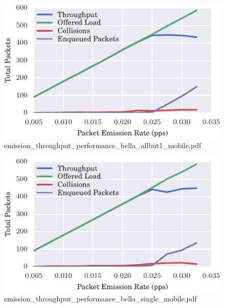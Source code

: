 \documentclass{article}
\begin{document}
\begin{figure}[h!]
\centering
\includegraphics[width=\linewidth]{emission_throughput_performance_bella_allbut1_mobile.pdf}
\caption{emission\_throughput\_performance\_bella\_allbut1\_mobile.pdf}
\end{figure}




\begin{figure}[h!]
\centering
\includegraphics[width=\linewidth]{emission_throughput_performance_bella_single_mobile.pdf}
\caption{emission\_throughput\_performance\_bella\_single\_mobile.pdf}
\end{figure}
\end{document}
